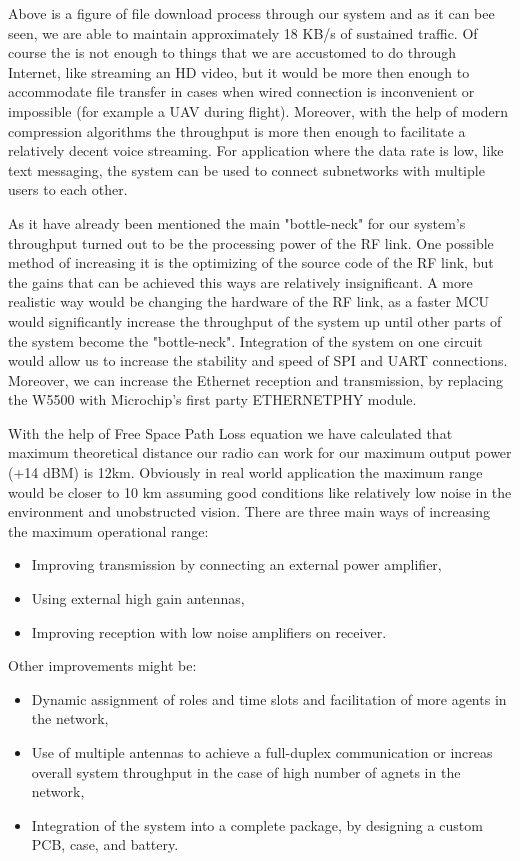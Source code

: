 Above is a figure of file download process through our system and as it can bee seen, we are able to maintain approximately 18 KB/s of sustained traffic. Of course the is not enough to things that we are accustomed to do through Internet, like streaming an HD video, but it would be more then enough to accommodate file transfer in cases when wired connection is inconvenient or impossible (for example a UAV during flight). Moreover, with the help of modern compression algorithms the throughput is more then enough to facilitate a relatively decent voice streaming. For application where the data rate is low, like text messaging, the system can be used to connect subnetworks with multiple users to each other. 

As it have already been mentioned the main "bottle-neck" for our system's throughput turned out to be the processing power of the RF link. One possible method of increasing it is the optimizing of the source code of the RF link, but the gains that can be achieved this ways are relatively insignificant. A more realistic way would be changing the hardware of the RF link, as a faster MCU would significantly increase the throughput of the system up until other parts of the system become the "bottle-neck". Integration of the system on one circuit would allow us to increase the stability and speed of SPI and UART connections. Moreover, we can increase the Ethernet reception and transmission, by replacing the W5500 with Microchip's first party ETHERNETPHY module.

With the help of Free Space Path Loss equation we have calculated that maximum theoretical distance our radio can work for our maximum output power (+14 dBM) is 12km. Obviously in real world application the maximum range would be closer to 10 km assuming good conditions like relatively low noise in the environment and unobstructed vision. There are three main ways of increasing the maximum operational range: 
\begin{itemize}[nolistsep]
    \item Improving transmission by connecting an external power amplifier,
    \item Using external high gain antennas, 
    \item Improving reception with low noise amplifiers on receiver.
\end{itemize}

Other improvements might be:
\begin{itemize}[nolistsep]
    \item Dynamic assignment of roles and time slots and facilitation of more agents in the network,
    \item Use of multiple antennas to achieve a full-duplex communication or increas overall system throughput in the case of high number of agnets in the network, 
    \item Integration of the system into a complete package, by designing a custom PCB, case, and battery.
\end{itemize}

